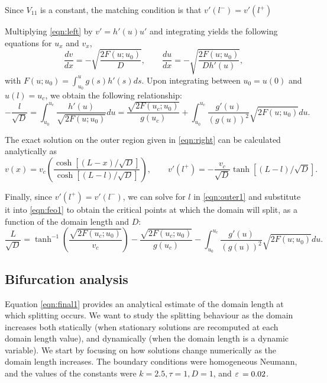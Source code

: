 Since $V_{11}$ is a constant, the matching condition is that $v'(l^-) = v'(l^+)$

Multiplying \eqref{eqn:left} by $v'=h'(u)u'$ and integrating yields the following equations for $u_x$ and $v_x$,
% 
\begin{equation*}
  \frac{dv}{dx} = -\sqrt{\frac{2F(u;u_0)}{D}},\qquad \frac{du}{dx} = -\sqrt{\frac{2F(u;u_0)}{Dh'(u)}},
\end{equation*}
% 
with $F(u;u_0) = \int_{u_0}^u g(s)h'(s)ds$. Upon integrating between $u_0=u(0)$ and $u(l)=u_c$, we obtain the following relationship:
% 
\begin{equation}
  \label{eqn:feo1}
  -\frac{l}{\sqrt{D}} = \int_{u_0}^{u_c}\frac{h'(u)}{\sqrt{2F(u;u_0)}}du = \frac{\sqrt{2F(u_c;u_0)}}{g(u_c)} + \int_{u_0}^{u_c}\frac{g'(u)}{(g(u))^2}\sqrt{2F(u;u_0)}du.
\end{equation}

The exact solution on the outer region given in \eqref{eqn:right} can be calculated analytically as 
% 
\begin{equation}
  \label{eqn:outer1}
  v(x) = v_c\left(\frac{\cosh\left[(L-x)/\sqrt{D}\right]}{\cosh\left[(L-l)/\sqrt{D}\right]}\right),\qquad v'(l^+)=-\frac{v_c}{\sqrt{D}}\tanh\left[(L-l)/\sqrt{D}\right].
\end{equation}

Finally, since $v'(l^+)=v'(l^-)$, we can solve for $l$ in \eqref{eqn:outer1} and substitute it into \eqref{eqn:feo1} to obtain the critical points at which the domain will split, as a function of the domain length and $D$:
% 
\begin{equation}
  \label{eqn:final1}
  \frac{L}{\sqrt{D}}=\tanh^{-1}\left(\frac{\sqrt{2F(u_c;u_0)}}{v_c} \right) - \frac{\sqrt{2F(u_c;u_0)}}{g(u_c)} - \int_{u_0}^{u_c}\frac{g'(u)}{(g(u))^2}\sqrt{2F(u;u_0)}du.
\end{equation}
% 

\subsection{Bifurcation analysis}

Equation \eqref{eqn:final1} provides an analytical estimate of the domain length at which splitting occurs. We want to study the splitting behaviour as the domain increases both statically (when stationary solutions are recomputed at each domain length value), and dynamically (when the domain length is a dynamic variable). We start by focusing on how solutions change numerically as the domain length increases. The boundary conditions were homogeneous Neumann, and the values of the constants were $k=2.5, \tau=1, D=1$, and $\varepsilon\,=0.02$. 

